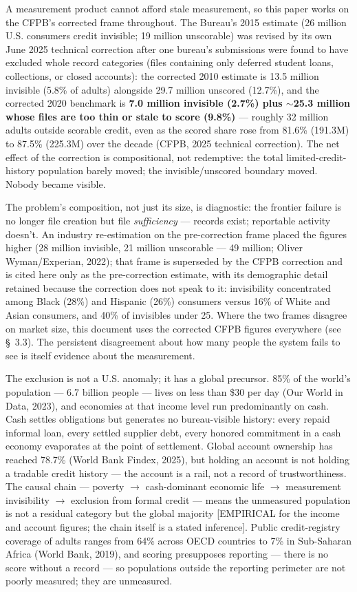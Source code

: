 \documentclass[
]{article}
\begin{document}
A measurement product cannot afford stale measurement, so this paper
works on the CFPB's corrected frame throughout. The Bureau's 2015
estimate (26 million U.S. consumers credit invisible; 19 million
unscorable) was revised by its own June 2025 technical correction after
one bureau's submissions were found to have excluded whole record
categories (files containing only deferred student loans, collections,
or closed accounts): the corrected 2010 estimate is 13.5 million
invisible (5.8\% of adults) alongside 29.7 million unscored (12.7\%),
and the corrected 2020 benchmark is \textbf{7.0 million invisible
(2.7\%) plus \(\sim\)25.3 million whose files are too thin or stale to
score (9.8\%)} --- roughly 32 million adults outside scorable credit,
even as the scored share rose from 81.6\% (191.3M) to 87.5\% (225.3M)
over the decade (CFPB, 2025 technical correction). The net effect of the
correction is compositional, not redemptive: the total
limited-credit-history population barely moved; the invisible/unscored
boundary moved. Nobody became visible.

The problem's composition, not just its size, is diagnostic: the
frontier failure is no longer file creation but file \emph{sufficiency}
--- records exist; reportable activity doesn't. An industry
re-estimation on the pre-correction frame placed the figures higher (28
million invisible, 21 million unscorable --- 49 million; Oliver
Wyman/Experian, 2022); that frame is superseded by the CFPB correction
and is cited here only as the pre-correction estimate, with its
demographic detail retained because the correction does not speak to it:
invisibility concentrated among Black (28\%) and Hispanic (26\%)
consumers versus 16\% of White and Asian consumers, and 40\% of
invisibles under 25. Where the two frames disagree on market size, this
document uses the corrected CFPB figures everywhere (see §~3.3). The
persistent disagreement about how many people the system fails to see is
itself evidence about the measurement.

The exclusion is not a U.S. anomaly; it has a global precursor. 85\% of
the world's population --- 6.7 billion people --- lives on less than
\$30 per day (Our World in Data, 2023), and economies at that income
level run predominantly on cash. Cash settles obligations but generates
no bureau-visible history: every repaid informal loan, every settled
supplier debt, every honored commitment in a cash economy evaporates at
the point of settlement. Global account ownership has reached 78.7\%
(World Bank Findex, 2025), but holding an account is not holding a
tradable credit history --- the account is a rail, not a record of
trustworthiness. The causal chain --- poverty \(\rightarrow\)
cash-dominant economic life \(\rightarrow\) measurement invisibility
\(\rightarrow\) exclusion from formal credit --- means the unmeasured
population is not a residual category but the global majority
{[}EMPIRICAL for the income and account figures; the chain itself is a
stated inference{]}. Public credit-registry coverage of adults ranges
from 64\% across OECD countries to 7\% in Sub-Saharan Africa (World
Bank, 2019), and scoring presupposes reporting --- there is no score
without a record --- so populations outside the reporting perimeter are
not poorly measured; they are unmeasured.
\end{document}
